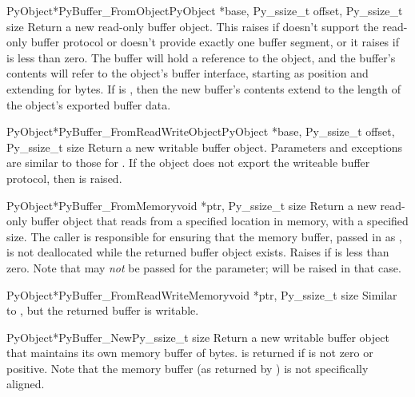 \begin{cfuncdesc}{PyObject*}{PyBuffer_FromObject}{PyObject *base,
                                                  Py_ssize_t offset, Py_ssize_t size}
  Return a new read-only buffer object.  This raises
   if  doesn't support the read-only
  buffer protocol or doesn't provide exactly one buffer segment, or it
  raises  if  is less than zero. The
  buffer will hold a reference to the  object, and the
  buffer's contents will refer to the  object's buffer
  interface, starting as position  and extending for
   bytes. If  is , then
  the new buffer's contents extend to the length of the 
  object's exported buffer data.
\end{cfuncdesc}

\begin{cfuncdesc}{PyObject*}{PyBuffer_FromReadWriteObject}{PyObject *base,
                                                           Py_ssize_t offset,
                                                           Py_ssize_t size}
  Return a new writable buffer object.  Parameters and exceptions are
  similar to those for .  If the
   object does not export the writeable buffer protocol,
  then  is raised.
\end{cfuncdesc}

\begin{cfuncdesc}{PyObject*}{PyBuffer_FromMemory}{void *ptr, Py_ssize_t size}
  Return a new read-only buffer object that reads from a specified
  location in memory, with a specified size.  The caller is
  responsible for ensuring that the memory buffer, passed in as
  , is not deallocated while the returned buffer object
  exists.  Raises  if  is less than
  zero.  Note that  may \emph{not} be
  passed for the  parameter;  will be
  raised in that case.
\end{cfuncdesc}

\begin{cfuncdesc}{PyObject*}{PyBuffer_FromReadWriteMemory}{void *ptr, Py_ssize_t size}
  Similar to , but the returned
  buffer is writable.
\end{cfuncdesc}

\begin{cfuncdesc}{PyObject*}{PyBuffer_New}{Py_ssize_t size}
  Return a new writable buffer object that maintains its own memory
  buffer of  bytes.   is returned if
   is not zero or positive.  Note that the memory buffer (as
  returned by ) is not specifically
  aligned.
\end{cfuncdesc}


